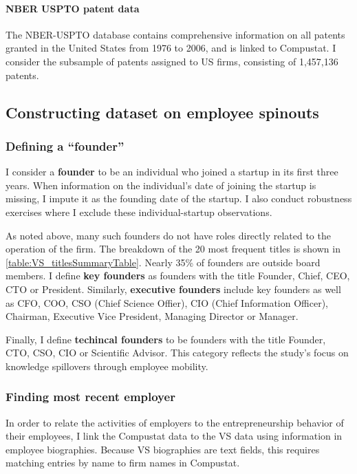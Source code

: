 \documentclass[12pt,english]{article}
\theoremstyle{remark}
\begin{document}
\paragraph{NBER USPTO patent data}

The NBER-USPTO database contains comprehensive information on all patents granted in the United States from 1976 to 2006, and is linked to Compustat. I consider the subsample of patents assigned to US firms, consisting of 1,457,136 patents. 

\subsection{Constructing dataset on employee spinouts}

\subsubsection{Defining a ``founder''}

I consider a \textbf{founder} to be an individual who joined a startup in its first three years. When information on the individual's date of joining the startup is missing, I impute it as the founding date of the startup. I also conduct robustness exercises where I exclude these individual-startup observations. 

As noted above, many such founders do not have roles directly related to the operation of the firm. The breakdown of the 20 most frequent titles is shown in \autoref{table:VS_titlesSummaryTable}. Nearly 35\% of founders are outside board members. I define \textbf{key founders} as founders with the title Founder, Chief, CEO, CTO or President. Similarly, \textbf{executive founders} include key founders as well as CFO, COO, CSO (Chief Science Offier), CIO (Chief Information Officer), Chairman, Executive Vice President, Managing Director or Manager. 

Finally, I define \textbf{techincal founders} to be founders with the title Founder, CTO, CSO, CIO or Scientific Advisor. This category reflects the study's focus on knowledge spillovers through employee mobility.



\subsubsection{Finding most recent employer}

In order to relate the activities of employers to the entrepreneurship behavior of their employees, I link the Compustat data to the VS data using information in employee biographies. Because VS biographies are text fields, this requires matching entries by name to firm names in Compustat.  
\end{document}

